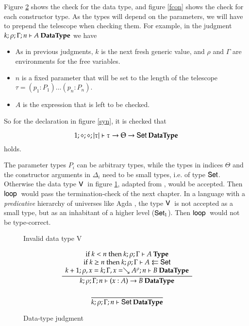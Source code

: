 Figure \ref{fdata} shows the check for the data type, and figure \ref{fcon} shows the check for each constructor type.
As the types will depend on the parameters, we will have to prepend the telescope when checking them.
For example, in the judgment $k;\rho;\Gamma;n\vdash A\:\mathbf{DataType}$ we have
\begin{itemize}
\item
As in previous judgments, $k$ is the next fresh generic value, and $\rho$ and $\Gamma$ are environments for the free variables.
\item
$n$ is a fixed parameter that will be set to the length of the telescope $\tau = ( p_1 : P_1) \ldots ( p_n : P_n)$. 
\item
$A$ is the expression that is left to be checked.
\end{itemize}
So for the declaration in figure \ref{syn}, it is checked that 

\[1;\diamond;\diamond;|\tau|\vdash\tau \rightarrow \Theta \rightarrow \mathsf{Set}\:\mathbf{DataType}\] holds.

The parameter types $P_i$ can be arbitrary types, while the types in indices $\Theta$  and the constructor arguments in $\Delta_i$  need to be small types, i.e. of type $\mathsf{Set}$. 
Otherwise the data type $\mathsf{V}\:$ in figure \ref{fv}, adapted from \cite{coquand92pattern}, would be accepted.
Then $\mathsf{loop}\:$ would pass the termination-check of the next chapter. In a language with a \emph{predicative} hierarchy of universes like Agda \cite{norell:thesis}, the type $\mathsf{V}\:$ is not accepted as a small type, but as an inhabitant of a higher level ($\mathsf{Set}_1$). Then $\mathsf{loop}\:$ would not be type-correct.



\begin{figure}[htp]
\caption{Invalid data type V}
\label{fv}
\end{figure}


\begin{figure}[htp]
\begin{gather*}
\ \dfrac{\begin{array}[b]{c}\mbox {if } k < n \mbox{ then } k;\rho;\Gamma\vdash A\:\mathbf{Type}\\\mbox {if } k \geq n \mbox { then } k;\rho;\Gamma\vdash A\leftleftarrows\mathsf{Set}\\k+1;\rho,x=k;\Gamma,x=\searrow A^{\rho};n\vdash B\:\mathbf{DataType}\end{array}}{k;\rho;\Gamma;n\vdash( x : A ) \rightarrow{B}\:\mathbf{DataType}}
\\[2ex]
\ \dfrac{}{k;\rho;\Gamma;n\vdash\mathsf{Set}\:\mathbf{DataType}}
\end{gather*}
\caption{Data-type judgment}
\label{fdata}
\end{figure}

